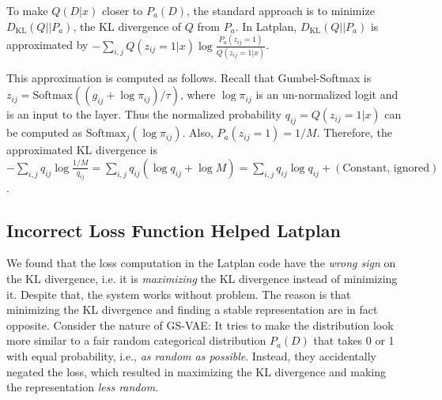 
To make $Q(D|x)$ closer to $P_a(D)$, the standard approach is to minimize $D_{\text{KL}}(Q||P_a)$,
the KL divergence of $Q$ from $P_a$.
In Latplan, $D_{\text{KL}}(Q||P_a)$ is approximated by
 $- \sum_{i,j} Q(z_{ij}=1|x) \log\frac{P_a(z_{ij}=1)}{Q(z_{ij}=1|x)}$.
\cite[A negated version of Eq.22, which is a maximization objective.]{MaddisonMT17}

This approximation is computed as follows.
Recall that Gumbel-Softmax is $z_{ij} = \text{Softmax}((g_{ij}+\log \pi_{ij})/\tau)$,
where $\log \pi_{ij}$ is an un-normalized logit and is an input to the layer.
Thus the normalized probability $q_{ij}=Q(z_{ij}=1|x)$ can be computed as $\text{Softmax}_j(\log \pi_{ij})$.
Also, $P_a(z_{ij}=1)= 1/M$.
% 
Therefore, the approximated KL divergence is
$-\sum_{i,j} q_{ij} \log \frac{1/M}{q_{ij}} = \sum_{i,j} q_{ij} (\log q_{ij} +\log M) = \sum_{i,j} q_{ij} \log q_{ij} + (\text{Constant, ignored})$.

\subsection{Incorrect Loss Function Helped Latplan}

We found that the loss computation in the Latplan code have the \emph{wrong sign} on the KL divergence,
i.e. it is \emph{maximizing} the KL divergence instead of minimizing it.
Despite that, the system works without problem.
% 
The reason is that minimizing the KL divergence and finding a stable representation are in fact opposite.
Consider the nature of GS-VAE:
It tries to make the distribution look more similar to a fair random categorical distribution $P_a(D)$
that takes 0 or 1 with equal probability, i.e., \emph{as random as possible}.
Instead, they accidentally negated the loss, which resulted in
maximizing the KL divergence and making the representation \emph{less random}.

